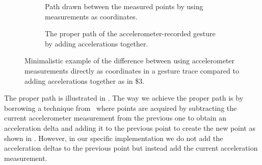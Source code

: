 \begin{figure}[h]
    \begin{subfigure}{.5\linewidth}
    \caption{Path drawn between the measured points by using measurements as coordinates.}
\label{fig:accelerometerpath}
    \end{subfigure}
    \begin{subfigure}{.5\linewidth}
    \caption{The proper path of the accelerometer-recorded gesture by adding accelerations together.}
\label{fig:acceleromterpath-proper}
    \end{subfigure}
\caption{Minimalistic example of the difference between using accelerometer measurements directly as coordinates in a gesture trace compared to adding accelerations together as in \$3.}
\end{figure}

The proper path is illustrated in .
The way we achieve the proper path is by borrowing a technique from~\cite{threedollar} where points are acquired by subtracting the current accelerometer measurement from the previous one to obtain an acceleration delta and adding it to the previous point to create the new point as shown in .
However, in our specific implementation we do not add the acceleration deltas to the previous point but instead add the current acceleration measurement.

